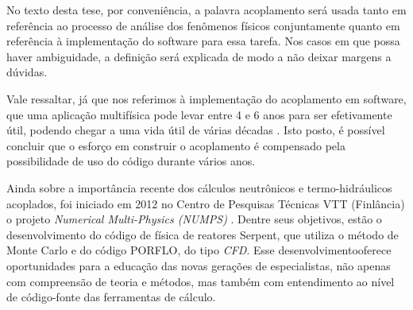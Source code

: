No texto desta tese, 
por conveniência, a palavra acoplamento será usada tanto em referência ao processo de análise dos fenômenos físicos conjuntamente 
quanto em referência à implementação do software para essa tarefa. Nos casos em que possa haver ambiguidade, 
a definição será explicada de modo a não deixar margens a dúvidas.

Vale ressaltar, já que nos referimos à implementação do acoplamento em software, que uma aplicação multifísica 
pode levar entre 4 e 6 anos para ser efetivamente útil, podendo chegar a uma vida útil de várias décadas 
\cite{Graham2004}. Isto posto, é possível concluir que o esforço em construir o acoplamento é compensado 
pela possibilidade de uso do código durante vários anos.

Ainda sobre a importância recente dos cálculos neutrônicos e termo-hidráulicos acoplados, foi iniciado em 2012
no Centro de Pesquisas Técnicas VTT (Finlância) o projeto \textit{Numerical Multi-Physics (NUMPS)} \cite{Leppanen2015}.
Dentre seus objetivos, estão o desenvolvimento do código de física de reatores Serpent, que utiliza o método de
Monte Carlo e do código PORFLO, do tipo \textit{CFD}. Esse desenvolvimentooferece oportunidades para a educação das novas
gerações de especialistas, não apenas com compreensão de teoria e métodos, mas também com entendimento ao nível de
código-fonte das ferramentas de cálculo.

